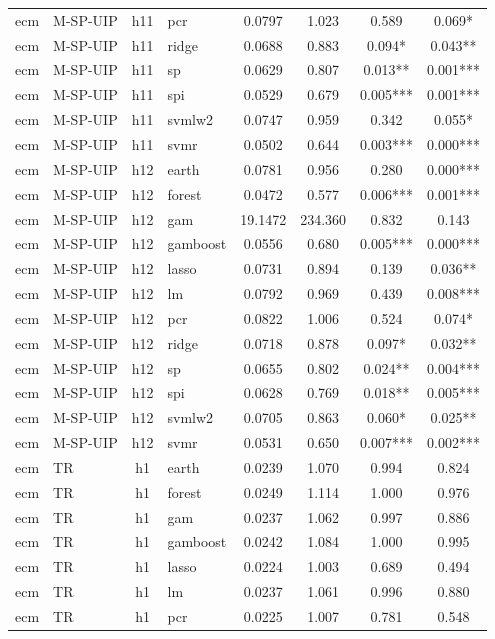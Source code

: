 \begin{ThreePartTable}
\begin{longtable}[t]{llclcccc}
ecm & M-SP-UIP & h11 & pcr & 0.0797 & 1.023 & 0.589 & 0.069*\\
ecm & M-SP-UIP & h11 & ridge & 0.0688 & 0.883 & 0.094* & 0.043**\\
ecm & M-SP-UIP & h11 & sp & 0.0629 & 0.807 & 0.013** & 0.001***\\
ecm & M-SP-UIP & h11 & spi & 0.0529 & 0.679 & 0.005*** & 0.001***\\
ecm & M-SP-UIP & h11 & svmlw2 & 0.0747 & 0.959 & 0.342 & 0.055*\\
ecm & M-SP-UIP & h11 & svmr & 0.0502 & 0.644 & 0.003*** & 0.000***\\
\addlinespace
ecm & M-SP-UIP & h12 & earth & 0.0781 & 0.956 & 0.280 & 0.000***\\
ecm & M-SP-UIP & h12 & forest & 0.0472 & 0.577 & 0.006*** & 0.001***\\
ecm & M-SP-UIP & h12 & gam & 19.1472 & 234.360 & 0.832 & 0.143\\
ecm & M-SP-UIP & h12 & gamboost & 0.0556 & 0.680 & 0.005*** & 0.000***\\
ecm & M-SP-UIP & h12 & lasso & 0.0731 & 0.894 & 0.139 & 0.036**\\
ecm & M-SP-UIP & h12 & lm & 0.0792 & 0.969 & 0.439 & 0.008***\\
ecm & M-SP-UIP & h12 & pcr & 0.0822 & 1.006 & 0.524 & 0.074*\\
ecm & M-SP-UIP & h12 & ridge & 0.0718 & 0.878 & 0.097* & 0.032**\\
ecm & M-SP-UIP & h12 & sp & 0.0655 & 0.802 & 0.024** & 0.004***\\
ecm & M-SP-UIP & h12 & spi & 0.0628 & 0.769 & 0.018** & 0.005***\\
ecm & M-SP-UIP & h12 & svmlw2 & 0.0705 & 0.863 & 0.060* & 0.025**\\
ecm & M-SP-UIP & h12 & svmr & 0.0531 & 0.650 & 0.007*** & 0.002***\\
\addlinespace
ecm & TR & h1 & earth & 0.0239 & 1.070 & 0.994 & 0.824\\
ecm & TR & h1 & forest & 0.0249 & 1.114 & 1.000 & 0.976\\
ecm & TR & h1 & gam & 0.0237 & 1.062 & 0.997 & 0.886\\
ecm & TR & h1 & gamboost & 0.0242 & 1.084 & 1.000 & 0.995\\
ecm & TR & h1 & lasso & 0.0224 & 1.003 & 0.689 & 0.494\\
ecm & TR & h1 & lm & 0.0237 & 1.061 & 0.996 & 0.880\\
ecm & TR & h1 & pcr & 0.0225 & 1.007 & 0.781 & 0.548\\

\end{longtable}
\end{ThreePartTable}
